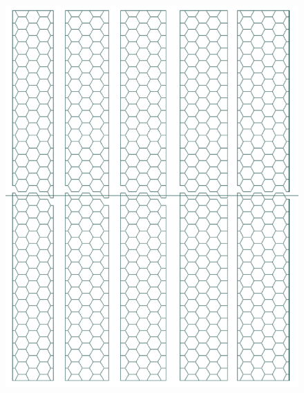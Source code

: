 \begin{figure}
\begin{minipage}[b]{.49\textwidth}
		\caption{}
		\label{fig:Calorimeter:SiDECAL:hexagon}
	\end{minipage}\hfill
	\begin{minipage}[b]{.49\textwidth}
		\includegraphics[width=\linewidth]{Calorimeter/SiliconTungstenSiD/siliconLayout}
		\caption{}
		\label{fig:Calorimeter:SiDECAL:siliconLayout}
	\end{minipage}
\end{figure}

